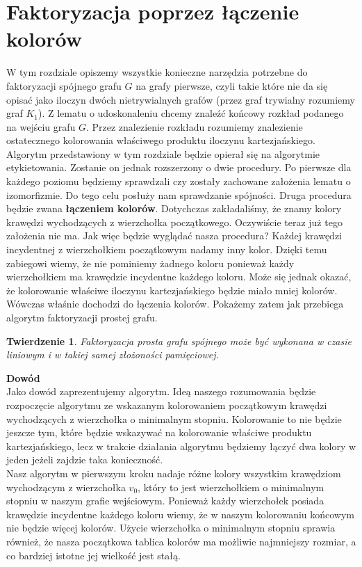\documentclass[12pt,a4paper,titlepage]{article}
\newtheorem{twr}{Twierdzenie}
\newcommand\tab[1][1cm]{\hspace*{#1}}
\begin{document}
\section{Faktoryzacja poprzez łączenie kolorów}
W tym rozdziale opiszemy wszystkie konieczne narzędzia potrzebne do faktoryzacji spójnego grafu $G$ na grafy pierwsze, czyli takie które nie da się opisać jako iloczyn dwóch nietrywialnych grafów (przez graf trywialny rozumiemy graf $K_1$). Z lematu o udoskonaleniu chcemy znaleźć końcowy rozkład podanego na wejściu grafu $G$. Przez znalezienie rozkładu rozumiemy znalezienie ostatecznego kolorowania właściwego produktu iloczynu kartezjańskiego. \\
\tab[0.6cm]Algorytm przedstawiony w tym rozdziale będzie opierał się na algorytmie etykietowania. Zostanie on jednak rozszerzony o dwie procedury. Po pierwsze dla każdego poziomu będziemy sprawdzali czy zostały zachowane założenia lematu o izomorfizmie. Do tego celu posłuży nam sprawdzanie spójności. Druga procedura będzie zwana \textbf{łączeniem kolorów}. Dotychczas zakładaliśmy, że znamy kolory krawędzi wychodzących z wierzchołka początkowego. Oczywiście teraz już tego założenia nie ma. Jak więc będzie wyglądać nasza procedura? Każdej krawędzi incydentnej z wierzchołkiem początkowym nadamy inny kolor. Dzięki temu zabiegowi wiemy, że nie pominiemy żadnego koloru ponieważ każdy wierzchołkiem ma krawędzie incydentne każdego koloru. Może się jednak okazać, że kolorowanie właściwe iloczynu kartezjańskiego będzie miało mniej kolorów. Wówczas właśnie dochodzi do łączenia kolorów. Pokażemy zatem jak przebiega algorytm faktoryzacji prostej grafu. 
\\
\begin{twr}Faktoryzacja prosta grafu spójnego może być wykonana w czasie liniowym i w takiej samej złożoności pamięciowej.
\end{twr}
\tab[-0.6cm]\textbf{Dowód}\\
\tab[0.6cm]Jako dowód zaprezentujemy algorytm. Ideą naszego rozumowania będzie rozpoczęcie algorytmu ze wskazanym kolorowaniem początkowym krawędzi wychodzących z wierzchołka o minimalnym stopniu. Kolorowanie to nie będzie jeszcze tym, które będzie wskazywać na kolorowanie właściwe produktu kartezjańskiego, lecz w trakcie działania algorytmu będziemy łączyć dwa kolory w jeden jeżeli zajdzie taka konieczność. \\
\tab[0.6cm]Nasz algorytm w pierwszym kroku nadaje różne kolory wszystkim krawędziom wychodzącym z wierzchołka $v_0$, który to jest wierzchołkiem o minimalnym stopniu w naszym grafie wejściowym. Ponieważ każdy wierzchołek posiada krawędzie incydentne każdego koloru wiemy, że w naszym kolorowaniu końcowym nie będzie więcej kolorów. Użycie wierzchołka o minimalnym stopniu sprawia również, że nasza początkowa tablica kolorów ma możliwie najmniejszy rozmiar, a co bardziej istotne jej wielkość jest stałą. \\
\end{document}
